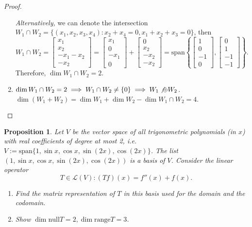 \documentclass{article}
\newtheorem{proposition}[thm]{Proposition}
\begin{document}
\begin{proof}
\begin{enumerate}[label=(\alph*)]
        \emph{Alternatively,} we can denote the intersection $W_1\cap W_2=\{(x_1,x_2,x_3,x_4):
        x_2+x_4=0, x_1+x_2+x_3=0\}$, then $$W_1\cap W_2 = 
        \begin{bmatrix}
            x_1 \\ x_2 \\ -x_1-x_2 \\ -x_2
        \end{bmatrix} = \begin{bmatrix}
            x_1 \\ 0 \\ -x_1 \\ 0
        \end{bmatrix} + \begin{bmatrix}
            0 \\ x_2 \\ -x_2 \\ -x_2
        \end{bmatrix} = \mathrm{span}\left\{\begin{bmatrix}
            1 \\ 0 \\ -1 \\ 0
        \end{bmatrix}, \begin{bmatrix}
            0 \\ 1 \\ -1 \\ -1
        \end{bmatrix}\right\}.$$ Therefore, $\dim W_1\cap W_2 = 2$.
        \item 
        $\dim W_1\cap W_2 = 2\implies W_1\cap W_2\neq \{0\}\implies W_1\not\oplus W_2$. 
        $\dim (W_1+W_2) = \dim W_1 + \dim W_2 - \dim W_1\cap W_2 = 4$.
    \end{enumerate}

\end{proof}
\begin{proposition}
    Let $V$ be the vector space of all trigonometric polynomials (in $x$) with real 
    coefficients of degree at most 2, i.e. $V:=\mathrm{span}\{1,\sin x, \cos x, \sin(2x), 
    \cos(2x)\}$. The list $(1,\sin x, \cos x, \sin (2x), \cos(2x))$ is a basis of $V$. 
    Consider the linear operator 
    $$T\in\mathcal{L}(V):(Tf)(x)=f''(x)+f(x).$$
    \begin{enumerate}[label=(\alph*)]
        \item Find the matrix representation of $T$ in this basis used for the domain and the 
        codomain.
        
        \item Show $\dim \mathrm{null}T=2, \dim\mathrm{range}T=3$.
    \end{enumerate}
\end{proposition}
\end{document}

